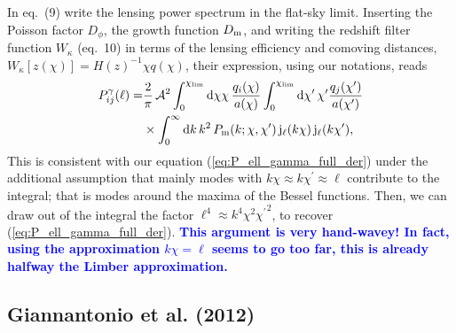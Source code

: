 \documentclass[fleqn,usenatbib]{mnras} %
\newcommand{\pref}{{\cal A}}
\newcommand{\mk}[1]{{\bf\textcolor{blue}{#1}}}
\begin{document}
\begin{appendix}
In eq.~(9) \cite{2008PhRvD..78d3002S} write the lensing power spectrum in the
flat-sky limit. Inserting the Poisson factor $D_\phi$, 
 the growth function $D_{\rm m}$, and writing the redshift filter
function $W_\kappa$ (eq.~10) in terms of the lensing efficiency and comoving distances,
$W_\kappa[z(\chi)] = H(z)^{-1} \chi q(\chi)$, their expression, using our notations, reads
%
\begin{align}
  P_{ij}^\gamma(\ell) = & \frac 2 \pi \, \pref^2
                 \int_{0}^{\chi_{\rm lim}} {\rm d} \chi \chi \, \frac{q_i(\chi)}{a(\chi)}
                \int_{0}^{\chi_{\rm lim}} {\rm d} \chi^\prime\, \chi^\prime
                \frac{q_j(\chi^\prime)}{a(\chi^\prime)}
                \nonumber \\
                & \times \int_0^\infty {\rm d} k \, k^2 \, P_{\rm m}(k; \chi, \chi^\prime) \,
                {\rm j}_\ell(k \chi) \, {\rm j}_\ell(k \chi^\prime) ,
  \label{eq:P_ell_gamma}
\end{align}
%
This is consistent with our equation (\ref{eq:P_ell_gamma_full_der}) under the additional assumption that
mainly modes with $k \chi \approx k \chi^\prime \approx \ell$ contribute to the integral; that is modes
around the maxima of the Bessel functions. Then, we can draw out of the integral the factor $\ell^4 \approx k^4 \chi^2 {\chi^\prime}^2$,
to recover (\ref{eq:P_ell_gamma_full_der}).
\mk{This argument is very hand-wavey! In fact, using the approximation $k \chi = \ell$ seems to go too far, this is already halfway the Limber approximation.}


\subsection{Giannantonio et al. (2012)}
\label{sec:giannantonio12}


\end{appendix}
\end{document}

